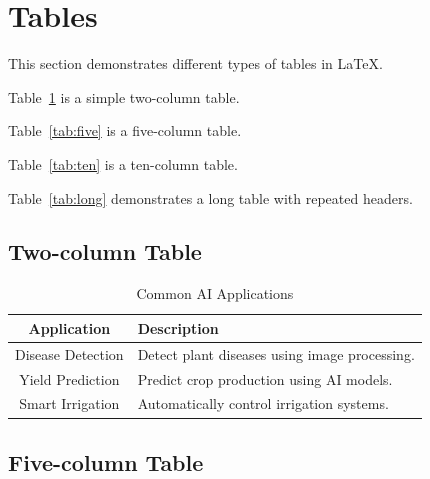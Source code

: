 \documentclass[pdflatex,sn-mathphys-num]{sn-jnl}%
\theoremstyle{thmstyleone}%
\theoremstyle{thmstyletwo}%
\theoremstyle{thmstylethree}%
\begin{document}
\section{Tables}
\label{sec:table}

This section demonstrates different types of tables in LaTeX.

Table~\ref{tab:two} is a simple two-column table.

Table~\ref{tab:five} is a five-column table.

Table~\ref{tab:ten} is a ten-column table.

Table~\ref{tab:long} demonstrates a long table with repeated headers.


\subsection{Two-column Table}

\begin{table}[h]
\centering
\caption{Common AI Applications}
\label{tab:two}

\begin{tabular}{|c|p{8cm}|}
\hline

Application & Description\\

\hline

Disease Detection &
Detect plant diseases using image processing.\\

\hline

Yield Prediction &
Predict crop production using AI models.\\

\hline

Smart Irrigation &
Automatically control irrigation systems.\\

\hline

\end{tabular}

\end{table}

\subsection{Five-column Table}
\end{document}
